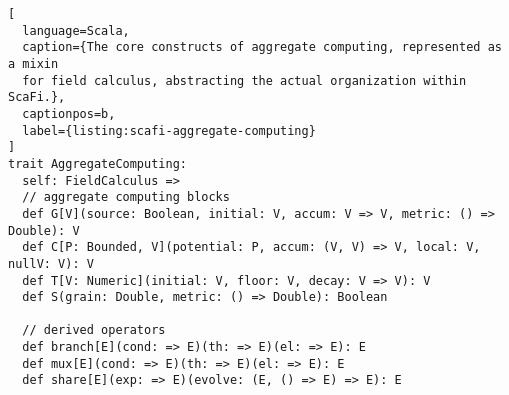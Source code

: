 \begin{lstlisting}[
  language=Scala,
  caption={The core constructs of aggregate computing, represented as a mixin
  for field calculus, abstracting the actual organization within ScaFi.},
  captionpos=b,
  label={listing:scafi-aggregate-computing}
]
trait AggregateComputing:
  self: FieldCalculus =>
  // aggregate computing blocks
  def G[V](source: Boolean, initial: V, accum: V => V, metric: () => Double): V
  def C[P: Bounded, V](potential: P, accum: (V, V) => V, local: V, nullV: V): V
  def T[V: Numeric](initial: V, floor: V, decay: V => V): V
  def S(grain: Double, metric: () => Double): Boolean

  // derived operators
  def branch[E](cond: => E)(th: => E)(el: => E): E
  def mux[E](cond: => E)(th: => E)(el: => E): E
  def share[E](exp: => E)(evolve: (E, () => E) => E): E
\end{lstlisting}


